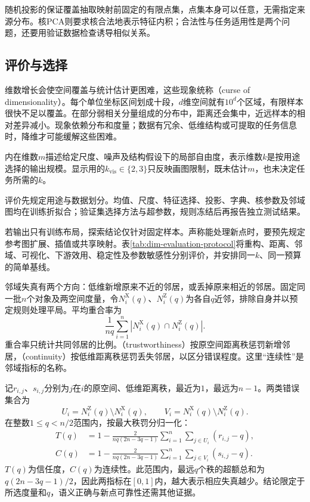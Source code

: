 随机投影的保证覆盖抽取映射前固定的有限点集，点集本身可以任意，无需指定来源分布。核PCA则要求核合法地表示特征内积；合法性与任务适用性是两个问题，还要用验证数据检查诱导相似关系。

\FloatBarrier
\subsection{评价与选择}

维数增长会使空间覆盖与统计估计更困难，这些现象统称（curse of dimensionality）。每个单位坐标区间划成十段，$d$维空间就有$10^d$个区域，有限样本很快不足以覆盖。在部分弱相关分量组成的分布中，距离还会集中，近远样本的相对差异减小。现象依赖分布和度量；数据有冗余、低维结构或可提取的任务信息时，降维才可能缓解这些困难。

内在维数$m$描述给定尺度、噪声及结构假设下的局部自由度，表示维数$k$是按用途选择的输出规模。显示用的$k_{\mathrm{vis}}\in\{2,3\}$只反映画图限制，既未估计$m$，也未决定任务所需的$k$。

评价先规定用途与数据划分。均值、尺度、特征选择、投影、字典、核参数及邻域图均在训练折拟合；验证集选择方法与超参数，规则冻结后再报告独立测试结果。

若输出只有训练布局，探索结论仅针对固定样本。声称能处理新点时，要预先规定参考图扩展、插值或共享映射。表\ref{tab:dim-evaluation-protocol}将重构、距离、邻域、可视化、下游效用、稳定性及参数敏感性分别评价，并安排同一$k$、同一预算的简单基线。

邻域失真有两个方向：低维新增原来不近的邻居，或丢掉原来相近的邻居。固定同一批$n$个对象及两空间度量，令$N_i^{\mathrm{X}}(q)$、$N_i^{\mathrm{Z}}(q)$为各自$q$近邻，排除自身并以预定规则处理平局。平均重合率为
\[
  \frac{1}{nq}\sum_{i=1}^{n}
  \left|N_i^{\mathrm{X}}(q)\cap N_i^{\mathrm{Z}}(q)\right|.
\]
重合率只统计共同邻居的比例。（trustworthiness）按原空间距离秩惩罚新增邻居，（continuity）按低维距离秩惩罚丢失邻居，以区分错误程度。这里“连续性”是邻域指标的名称。

记$r_{i,j}$、$s_{i,j}$分别为$j$在$i$的原空间、低维距离秩，最近为$1$，最远为$n-1$。两类错误集合为
\[
  U_i=N_i^{\mathrm{Z}}(q)\setminus N_i^{\mathrm{X}}(q),
  \qquad
  V_i=N_i^{\mathrm{X}}(q)\setminus N_i^{\mathrm{Z}}(q).
\]
在整数$1\leq q<n/2$范围内，按最大秩罚分归一化：
\begin{equation}
  \begin{aligned}
    T(q)
      &=1-\frac{2}{nq(2n-3q-1)}
        \sum_{i=1}^{n}\sum_{j\in U_i}(r_{i,j}-q),\\
    C(q)
      &=1-\frac{2}{nq(2n-3q-1)}
        \sum_{i=1}^{n}\sum_{j\in V_i}(s_{i,j}-q).
  \end{aligned}
  \label{eq:dim-neighborhood-quality}
\end{equation}
$T(q)$为信任度，$C(q)$为连续性。此范围内，最远$q$个秩的超额总和为$q(2n-3q-1)/2$，因此两指标在$[0,1]$内，越大表示相应失真越少。结论限定于所选度量和$q$，语义正确与新点可靠性还需其他证据。

